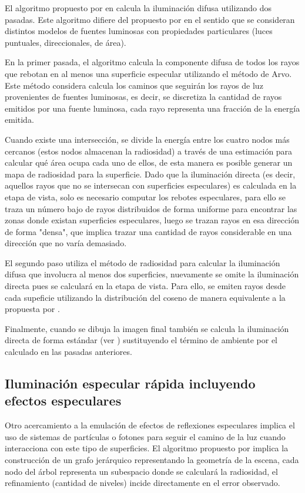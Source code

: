 El algoritmo propuesto por \citeauthor{Shirley} en \citeyear{Shirley} calcula la iluminación difusa utilizando dos pasadas. Este algoritmo difiere del propuesto por \citeauthor{Sillion} en el sentido que se consideran distintos modelos de fuentes luminosas con propiedades particulares (luces puntuales, direccionales, de área).

En la primer pasada, el algoritmo calcula la componente difusa de todos los rayos que rebotan en al menos una superficie especular utilizando el método de Arvo. Este método considera calcula los caminos que seguirán los rayos de luz provenientes de fuentes luminosas, es decir, se discretiza la cantidad de rayos emitidos por una fuente luminosa, cada rayo representa una fracción de la energía emitida.

Cuando existe una intersección, se divide la energía entre los cuatro nodos más cercanos (estos nodos almacenan la radiosidad) a través de una estimación para calcular qué área ocupa cada uno de ellos, de esta manera es posible generar un mapa de radiosidad para la superficie. Dado que la iluminación directa (es decir, aquellos rayos que no se intersecan con superficies especulares) es calculada en la etapa de vista, solo es necesario computar los rebotes especulares, para ello se traza un número bajo de rayos distribuidos de forma uniforme para encontrar las zonas donde existan superficies especulares, luego se trazan rayos en esa dirección de forma "densa", que implica trazar una cantidad de rayos considerable en una dirección que no varía demasiado.

El segundo paso utiliza el método de radiosidad para calcular la iluminación difusa que involucra al menos dos superficies, nuevamente se omite la iluminación directa pues se calculará en la etapa de vista. Para ello, se emiten rayos desde cada supeficie utilizando la distribución del coseno de manera equivalente a la propuesta por \citeauthor{Malley}. 

Finalmente, cuando se dibuja la imagen final también se calcula la iluminación directa de forma estándar (ver \cite{Whitted}) sustituyendo el término de ambiente por el calculado en las pasadas anteriores.

\subsection{Iluminación especular rápida incluyendo efectos especulares}

Otro acercamiento a la emulación de efectos de reflexiones especulares implica el uso de sistemas de partículas o fotones para seguir el camino de la luz cuando interacciona con este tipo de superficies. El algoritmo propuesto por \citeauthor{Granier} implica la construcción de un grafo jerárquico representando la geometría de la escena, cada nodo del árbol representa un subespacio donde se calculará la radiosidad, el refinamiento (cantidad de niveles) incide directamente en el error observado.

